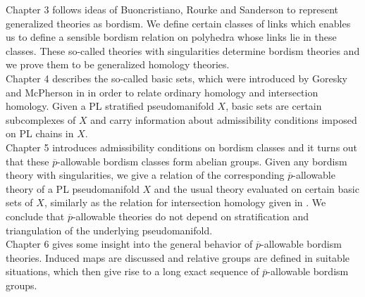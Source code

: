 \documentclass{scrreprt}
\begin{document}
Chapter 3 follows ideas of Buoncristiano, Rourke and Sanderson to represent generalized theories as bordism. We define certain classes of links which enables us to define a sensible bordism relation on polyhedra whose links lie in these classes. These so-called theories with singularities determine bordism theories and we prove them to be generalized homology theories. \\
Chapter 4 describes the so-called basic sets, which were introduced by Goresky and McPherson in \cite{GM} in order to relate ordinary homology and intersection homology. Given a PL stratified pseudomanifold $X$, basic sets are certain subcomplexes of $X$ and carry information about admissibility conditions imposed on PL chains in $X$. \\
Chapter 5 introduces admissibility conditions on bordism classes and it turns out that these $\overline{p}$-allowable bordism classes form abelian groups. Given any bordism theory with singularities, we give a relation of the corresponding $\overline{p}$-allowable theory of a PL pseudomanifold $X$ and the usual theory evaluated on certain basic sets of $X$, similarly as the relation for intersection homology given in \cite{GM}. We conclude that $\overline{p}$-allowable theories do not depend on stratification and triangulation of the underlying pseudomanifold. \\
Chapter 6 gives some insight into the general behavior of $\overline{p}$-allowable bordism theories. Induced maps are discussed and relative groups are defined in suitable situations, which then give rise to a long exact sequence of $\overline{p}$-allowable bordism groups.
\end{document}
